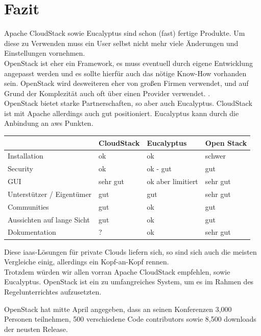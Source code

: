 \documentclass[a4paper,nochapterprefix,ngerman,12pt]{scrreprt}
\begin{document}
\chapter{Fazit} \thispagestyle{fancy}
Apache CloudStack sowie Eucalyptus sind schon (fast) fertige Produkte. Um diese zu Verwenden muss ein User selbst nicht mehr viele Änderungen und Einstellungen vornehmen.\\
OpenStack ist eher ein Framework, es muss eventuell durch eigene Entwicklung angepasst werden und es sollte hierfür auch das nötige Know-How vorhanden sein.\cite{OSundAVerg} OpenStack wird desweiteren eher von großen Firmen verwendet, und auf Grund der Komplezität auch oft über einen Provider verwendet. \cite{allthreeverg}. \\
OpenStack bietet starke Partnerschaften, so aber auch Eucalyptus. CloudStack ist mit Apache allerdings auch gut positioniert. Eucalyptus kann durch die Anbindung an \gls{aws} Punkten.
\begin{table}[h]
\begin{tabular}{|p{}|p{}|p{}|p{}|}
\hline
 & \textbf{CloudStack} & \textbf{Eucalyptus} & \textbf{Open Stack} \\ \hline
Installation  &  ok  & ok & schwer   \\
Security  & ok & ok - gut &         gut            \\ 
GUI  &  sehr gut  & ok aber limitiert&      sehr gut          \\ 
Unterstützer / Eigentümer  & gut & gut & sehr gut \\ 
Communities  & gut & ok & gut  \\ 
Aussichten auf lange Sicht  & gut & ok & gut \\ 
Dokumentation & ? & ok &  sehr gut \\ 
\hline
\end{tabular}
\end{table}
Diese \gls{iaas}-Lösungen für private Clouds liefern sich, so sind sich auch die meisten Vergleiche einig, allerdings ein Kopf-an-Kopf rennen. \\
Trotzdem würden wir allen vorran Apache CloudStack empfehlen, sowie Eucalyptus. \cite{allthreeverg}
OpenStack ist ein zu umfangreiches System, um es im Rahmen des Regelunterrichtes aufzusetzten.



OpenStack hat mitte April angegeben, dass an seinen Konferenzen 3,000 Personen teilnehmen, 500 verschiedene Code contributors sowie 8,500 downloads der neusten Release. \cite{allthreeverg}



 


 \thispagestyle{fancy}
 \thispagestyle{fancy}

\listoffigures \thispagestyle{fancy}

\printglossary[style=tree,title={Glossar}]  \thispagestyle{fancy}

\label{lastpage}
\end{document}
